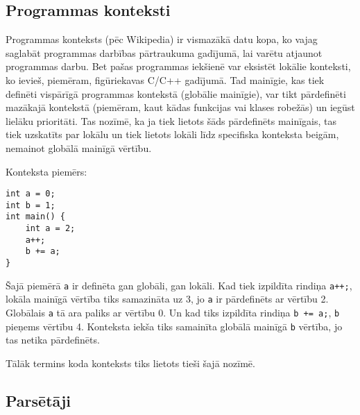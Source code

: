 \subsection{Programmas konteksti}
Programmas konteksts (pēc Wikipedia) ir vismazākā datu kopa, ko vajag saglabāt programmas darbības pārtraukuma gadījumā, lai varētu atjaunot programmas darbu. Bet pašas programmas iekšienē var eksistēt lokālie konteksti, ko ievieš, piemēram, figūriekavas C/C++ gadījumā. Tad mainīgie, kas tiek definēti vispārīgā programmas kontekstā (globālie mainīgie), var tikt pārdefinēti mazākajā kontekstā (piemēram, kaut kādas funkcijas vai klases robežās) un iegūst lielāku prioritāti. Tas nozīmē, ka ja tiek lietots šāds pārdefinēts mainīgais, tas tiek uzskatīts par lokālu un tiek lietots lokāli līdz specifiska konteksta beigām, nemainot globālā mainīgā vērtību.

Konteksta piemērs:
\begin{verbatim}
int a = 0;
int b = 1;
int main() {
    int a = 2;
    a++;
    b += a;
}
\end{verbatim} 
Šajā piemērā \verb|a| ir definēta gan globāli, gan lokāli. Kad tiek izpildīta rindiņa \verb|a++;|, lokāla mainīgā vērtība tiks samazināta uz 3, jo \verb|a| ir pārdefinēts ar vērtību 2. Globālais \verb|a| tā ara paliks ar vērtību 0. Un kad tiks izpildīta rindiņa \verb|b += a;|, \verb|b| pieņems vērtību 4. Konteksta iekša tiks samainīta globālā mainīgā \verb|b| vērtība, jo tas netika pārdefinēts.

Tālāk termins koda konteksts tiks lietots tieši šajā nozīmē. 

\subsection{Parsētāji}

